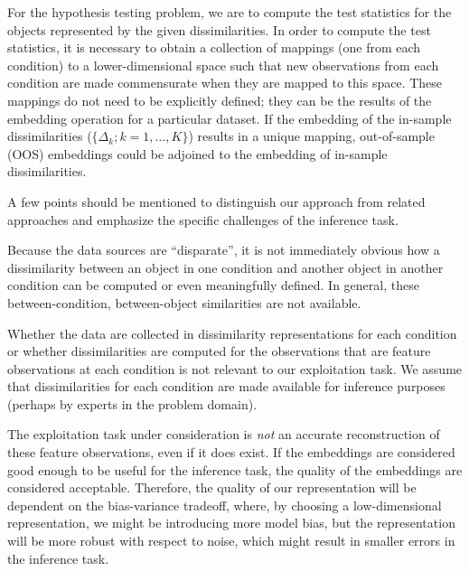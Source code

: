 \documentclass[12pt,oneside,final]{thesis}\usepackage[]{graphicx}\usepackage[]{color}
\begin{document}
 
For the hypothesis testing problem, we are to compute the test statistics for the objects represented by the given dissimilarities. In order to compute the test statistics, it is necessary to obtain a collection of mappings (one from each condition) to a lower-dimensional space such that new observations from each condition are made commensurate when they are  mapped to this space.
 These mappings do not need to be explicitly defined; they can be the results of the embedding operation for a particular dataset. If the embedding of the in-sample dissimilarities ($\{\Delta_k;k=1,\ldots,K\}$) results in a unique mapping, out-of-sample (OOS) embeddings could be adjoined to the embedding of in-sample dissimilarities.

A few points should be mentioned to distinguish our approach from related approaches and emphasize the specific challenges of the inference task.
\begin{remark}
Because the data sources are ``disparate'', it is not immediately obvious how a dissimilarity between an object in one condition and another object in another condition  can be computed or even meaningfully defined.  In general, these between-\-condition, between-\-object  similarities are not available.
\label{rem:between_cond_diss}
\end{remark}
 \begin{remark}
 Whether the data are collected in dissimilarity representations for each condition or whether dissimilarities are computed for the observations that are feature observations at each condition is not relevant to our exploitation task. We assume  that dissimilarities for each condition are made available for inference purposes (perhaps by experts in the problem domain). 
\end{remark}

\begin{remark}
The exploitation task under consideration is \emph{not} an accurate reconstruction of these feature observations, even if it does exist.
 If the embeddings are considered good enough to be useful for the inference task, the quality of the embeddings are considered acceptable. Therefore, the quality of our representation will be dependent on the bias-variance tradeoff, where, by choosing a low-dimensional representation, we might be introducing more model bias, but the representation will be more robust with respect to noise, which might result in smaller errors in the inference task.
\end{remark}
\end{document}
